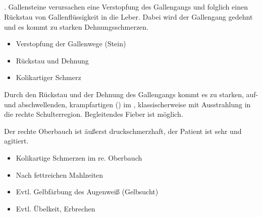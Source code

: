 


\subsection{}
\label{topic:gallenkolik}%
%
%





\TextSlide{\TxBeschreibung} 
{%
 . Gallensteine
verursachen eine Verstopfung des Gallengangs und 
folglich einen Rückstau von
Gallenflüssigkeit in die Leber. Dabei wird der Gallengang
gedehnt und es kommt zu starken Dehnungsschmerzen.} 
{
\begin{itemize}
  \item Verstopfung der Gallenwege (Stein)
  \item Rückstau und Dehnung
  \item Kolikartiger Schmerz
\end{itemize}
}{}{}{}


\TextSlide{\TxSymptome}
{%
Durch den Rückstau und der Dehnung des Gallengangs kommt es
zu starken, auf- und abschwellenden, krampfartigen
()  im , klassischerweise mit Ausstrahlung in die rechte
Schulterregion. Begleitendes Fieber ist möglich.

Der rechte Oberbauch ist äußerst druckschmerzhaft, der
Patient ist sehr  und agitiert.

}{
\begin{itemize}
  \item Kolikartige Schmerzen im re. Oberbauch
  \item Nach fettreichen Mahlzeiten
  \item Evtl. Gelbfärbung des Augenweiß (Gelbsucht)
  \item Evtl. Übelkeit, Erbrechen
\end{itemize}
}{}{}{}




